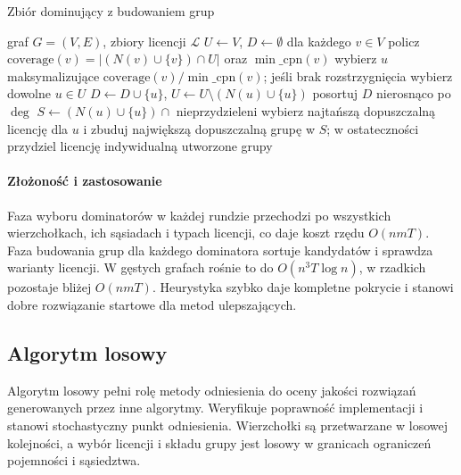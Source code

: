 \begin{algorithm}[H]
  \caption{Zbiór dominujący z budowaniem grup}\label{alg:ds}
  \begin{algorithmic}[1]
    \Require graf $G=(V,E)$, zbiory licencji $\mathcal{L}$
    \State $U\gets V$, $D\gets\emptyset$
    \State dla każdego $v\in V$ policz $\mathrm{coverage}(v)=|(N(v)\cup\{v\})\cap U|$ oraz $\min\_\mathrm{cpn}(v)$
    \State wybierz $u$ maksymalizujące $\mathrm{coverage}(v)/\min\_\mathrm{cpn}(v)$; jeśli brak rozstrzygnięcia wybierz dowolne $u\in U$
    \State $D\gets D\cup\{u\}$, $U\gets U\setminus(N(u)\cup\{u\})$
    \EndWhile
    \State posortuj $D$ nierosnąco po $\deg$
    \State $S\gets (N(u)\cup\{u\})\cap$ nieprzydzieleni
    \State wybierz najtańszą dopuszczalną licencję dla $u$ i zbuduj największą dopuszczalną grupę w $S$; w ostateczności przydziel licencję indywidualną
    \EndFor
    \State \Return utworzone grupy
  \end{algorithmic}
\end{algorithm}

\paragraph{Złożoność i zastosowanie}
Faza wyboru dominatorów w każdej rundzie przechodzi po wszystkich wierzchołkach, ich sąsiadach i typach licencji, co daje koszt rzędu \(O(n m T)\). Faza budowania grup dla każdego dominatora sortuje kandydatów i sprawdza warianty licencji. W gęstych grafach rośnie to do \(O(n^3 T \log n)\), w rzadkich pozostaje bliżej \(O(n m T)\). Heurystyka szybko daje kompletne pokrycie i stanowi dobre rozwiązanie startowe dla metod ulepszających.

\subsection{Algorytm losowy}\label{subsec:random}

Algorytm losowy pełni rolę metody odniesienia do oceny jakości rozwiązań generowanych przez inne algorytmy. Weryfikuje poprawność implementacji i stanowi stochastyczny punkt odniesienia. Wierzchołki są przetwarzane w losowej kolejności, a wybór licencji i składu grupy jest losowy w granicach ograniczeń pojemności i sąsiedztwa.


